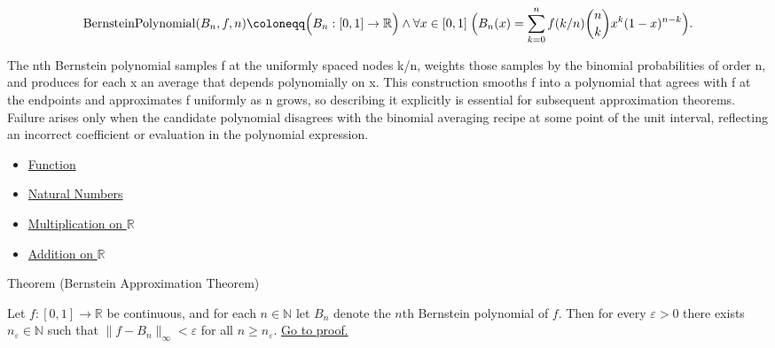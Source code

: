 \begin{remark*}
\[
\operatorname{BernsteinPolynomial}(B_n,f,n)\coloneqq
\Bigl(B_n:[0,1]\to\mathbb{R}\Bigr)\land
\forall x\in[0,1]\;
\Bigl(
B_n(x)=\sum_{k=0}^n f(k/n)\binom{n}{k}x^k(1-x)^{n-k}
\Bigr).
\]
\end{remark*}

\begin{remark*}[Interpretation]
The nth Bernstein polynomial samples f at the uniformly spaced nodes k/n, weights those samples by the binomial probabilities of order n, and produces for each x an average that depends polynomially on x. This construction smooths f into a polynomial that agrees with f at the endpoints and approximates f uniformly as n grows, so describing it explicitly is essential for subsequent approximation theorems. Failure arises only when the candidate polynomial disagrees with the binomial averaging recipe at some point of the unit interval, reflecting an incorrect coefficient or evaluation in the polynomial expression.
\end{remark*}

\begin{dependencies}
\begin{itemize}
  \item \hyperref[def:function]{Function}
  \item \hyperref[def:natural-numbers]{Natural Numbers}
  \item \hyperref[def:multiplication-on-r]{Multiplication on $\mathbb{R}$}
  \item \hyperref[def:addition-on-r]{Addition on $\mathbb{R}$}
\end{itemize}
\end{dependencies}

\begin{theorembox}{Theorem (Bernstein Approximation Theorem)}
\begin{theorem}
\label{thm:bernstein-approximation}
Let $f:[0,1]\to\mathbb{R}$ be continuous, and for each $n\in\mathbb{N}$ let $B_n$ denote the $n$th Bernstein polynomial of $f$. Then for every $\varepsilon>0$ there exists $n_\varepsilon\in\mathbb{N}$ such that $\|f-B_n\|_\infty<\varepsilon$ for all $n\ge n_\varepsilon$. \hyperref[prf:bernstein-approximation]{Go to proof.}
\end{theorem}
\end{theorembox}

